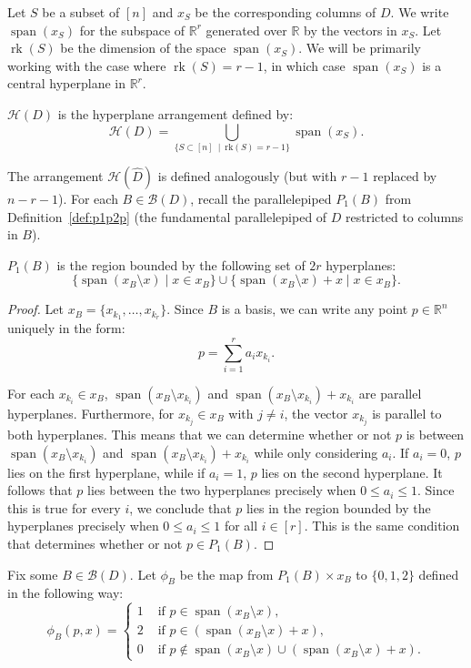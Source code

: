 \documentclass[ALCO,ThmDefs,Unicode,epreuves]{cedram}
\newcommand{\R}{\mathbb{R}}
\newcommand{\B}{\mathcal{B}}
\newcommand{\what}{\widehat}
\newcommand{\CB}{x_B}
\newcommand{\colB}[1]{x_{k_{#1}}}
\newcommand{\CS}{x_S}
\DeclareMathOperator{\rk}{rk}
\DeclareMathOperator{\spn}{span}
\begin{document}
Let $S$ be a subset of $[n]$ and $\CS$ be the corresponding columns of $D$. We write $\spn(\CS)$ for the subspace of $\R^r$ generated over $\R$ by the vectors in $\CS$. Let $\rk(S)$ be the dimension of the space $\spn(\CS)$. We will be primarily working with the case where $\rk(S) = r-1$, in which case $\spn(\CS)$ is a central hyperplane in $\R^r$. 

\begin{defi}
$\mathcal H(D)$ is the hyperplane arrangement defined by:
\[
 \mathcal H(D) = \bigcup_{\{S \subset [n] ~\mid~ \text{rk}(S) = r-1\}} \spn(x_S).
\]
\end{defi}

The arrangement $\mathcal H(\what D)$ is defined analogously (but with $r-1$ replaced by $n-r-1$). For each $B \in \B(D)$, recall the parallelepiped $P_1(B)$ from Definition~\ref{def:p1p2p} (\ie the fundamental parallelepiped of $D$ restricted to columns in $B$). 

\begin{lemma}\label{lem:p1hyp} $P_1(B)$ is the region bounded by the following set of $2r$ hyperplanes:
\[
\{\spn(\CB \setminus x) \mid x \in \CB\} \cup \{\spn(\CB \setminus x) + x \mid x \in \CB\}.
\]
\end{lemma}
\begin{proof}
Let $\CB = \{\colB 1,\dots, \colB r\}$. Since $B$ is a basis, we can write any point $p \in \R^n$ uniquely in the form:
\[
p = \sum_{i=1}^r a_i \colB i.
\]

For each $\colB i\in \CB$, $\spn(\CB \setminus \colB i)$ and $\spn(\CB \setminus \colB i)+\colB i$ are parallel hyperplanes. Furthermore, for $\colB j \in \CB$ with $j \not= i$, the vector $\colB j$ is parallel to both hyperplanes. This means that we can determine whether or not $p$ is between $\spn(\CB \setminus \colB i)$ and $\spn(\CB \setminus \colB i)+\colB i$ while only considering $a_i$. If $a_i = 0$, $p$ lies on the first hyperplane, while if $a_i = 1$, $p$ lies on the second hyperplane. It follows that $p$ lies between the two hyperplanes precisely when $0 \le a_i \le 1$. Since this is true for every $i$, we conclude that $p$ lies in the region bounded by the hyperplanes precisely when $0 \le a_i \le 1$ for all $i \in [r]$. This is the same condition that determines whether or not $p \in P_1(B)$. 
\end{proof}

\begin{defi}
Fix some $B \in \B(D)$. Let $\phi_B$ be the map from $P_1(B) \times \CB$ to $\{0,1,2\}$ defined in the following way:
\[
\phi_B(p,x) = \begin{cases}
 1 & \text{ if } p \in \spn(\CB\setminus x),\\
 2 &\text{ if } p \in (\spn(\CB\setminus x)+x),\\
 0 &\text{ if } p \notin \spn(\CB\setminus x) \cup (\spn(\CB\setminus x)+x).
\end{cases}
\]
\end{defi}
\end{document}
